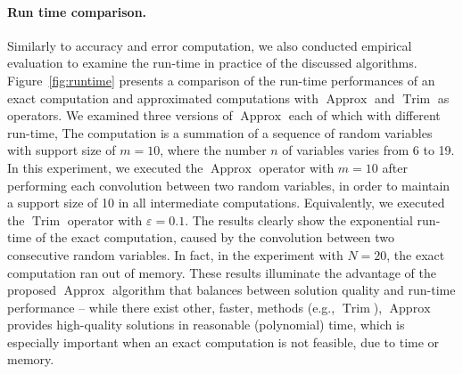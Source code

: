 \documentclass[letterpaper]{article} %
\DeclareMathOperator{\Trim}{Trim}
\DeclareMathOperator{\KlmApprox}{Approx}
\begin{document}
\paragraph{Run time comparison.}
Similarly to accuracy and error computation, we also conducted empirical evaluation to examine the run-time in practice of the discussed algorithms. Figure~\ref{fig:runtime} presents a comparison of the run-time performances of an exact computation and approximated computations with $\KlmApprox$ and $\Trim$ as operators. We examined three versions of $\KlmApprox$ each of which with different run-time,  The computation is a summation of a sequence of random variables with support size of $m{=}10$, where the number $n$ of variables varies from 6 to 19. In this experiment, we executed the $\KlmApprox$ operator with $m{=}10$ after performing each convolution between two random variables, in order to maintain a support size of 10 in all intermediate computations. 
Equivalently, we executed the $\Trim$ operator with $\varepsilon=0.1$.
The results clearly show the exponential run-time of the exact computation, caused by the convolution between two consecutive random variables. In fact, in the experiment with $N{=}20$, the exact computation ran out of memory. These results illuminate the advantage of the proposed $\KlmApprox$ algorithm that balances between solution quality and run-time performance -- while there exist other, faster, methods (e.g., $\Trim$), $\KlmApprox$ provides high-quality solutions in reasonable (polynomial) time, which is especially important when an exact computation is not feasible, due to time or memory.
\end{document}
